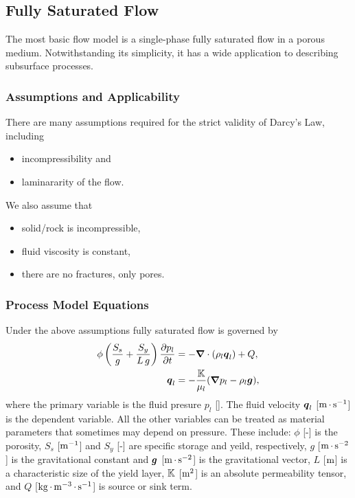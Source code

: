 \subsection{Fully Saturated Flow}
\label{sec:flow-single-phase}

The most basic flow model is a single-phase fully saturated flow in a porous medium.  
Notwithstanding its simplicity, it has a wide application to
describing subsurface processes.


\subsubsection{Assumptions and Applicability}

There are many assumptions required for the strict validity of Darcy's Law, 
including 
\begin{itemize}
\item
  incompressibility and 
\item
  laminararity of the flow.
\end{itemize}
We also assume that 
\begin{itemize}
\item
  solid/rock is incompressible,
\item 
  fluid viscosity is constant,
\item
  there are no fractures, only pores.
\end{itemize}

\subsubsection{Process Model Equations}

Under the above assumptions fully saturated flow is governed by 
\begin{subequations}
\label{eq:Darcy fully saturated}
\begin{align}
  \phi \left(\displaystyle \frac{S_s}{g} + \displaystyle \frac{S_y}{L\,g}\right) \frac{\partial p_l}{\partial t} 
  &=
  -\boldsymbol{\nabla} \cdot (\rho_l \boldsymbol{q}_l) + Q,
  \\
  {\boldsymbol{q}}_l &= -\frac{{\mathbb K}}{\mu_l} 
  ({\boldsymbol{\nabla}} p_l - \rho_l {\boldsymbol{g}}),
\end{align}
\end{subequations}
where the primary variable is the fluid presure $p_l$ [\upa]. 
The fluid velocity ${\boldsymbol{q}}_l$ [${\rm m}{\,\cdot\,}{\rm s}^{-1}$] is the dependent variable.
All the other variables can be treated as material parameters
that sometimes may depend on pressure.
These include:
$\phi$ [-] is the porosity,
$S_s$ [${\rm m}^{-1}$] and $S_y$ [-] are specific storage and yeild, respectively,
$g$ [${\rm m}{\,\cdot\,}{\rm s}^{-2}$] is the gravitational constant
and ${\boldsymbol{g}}$ [${\rm m}{\,\cdot\,}{\rm s}^{-2}$] is the gravitational vector,  
$L$ [${\rm m}$] is a characteristic size of the yield layer, 
${\mathbb K}$ [${\rm m}^2$] is an absolute permeability tensor, and 
$Q$ [${\rm kg} {\,\cdot\,} {\rm m}^{-3} {\,\cdot\,} {\rm s}^{-1}$] is source or sink term.
 

